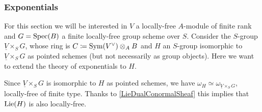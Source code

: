 \subsubsection{Exponentials}
For this section we will be interested in $V$ a locally-free $A$-module of finite rank
and $G = \operatorname{Spec}(B)$ a finite locally-free group scheme over $S$.
Consider the $S$-group $\underline{V} \times_{ S } G$, whose ring is
$C \coloneqq \operatorname{Sym}(V^\vee) \otimes_A B$ and $H$ an $S$-group isomorphic
to $\underline{V} \times_{ S } G$ as pointed schemes (but not necessarily
as group objects).
Here we want to extend the theory of exponentials to $H$.


\begin{rem}[]
	Since $\underline{V} \times_{ S } G$ is isomorphic to $H$ as pointed
	schemes, we have $\omega_H \simeq \omega_{\underline{V} \times_S G}$, 
	locally-free of finite type.
	Thanks to \cref{LieDualConormalSheaf}
	this implies that $\operatorname{Lie}(H)$ is also locally-free.
\end{rem}


